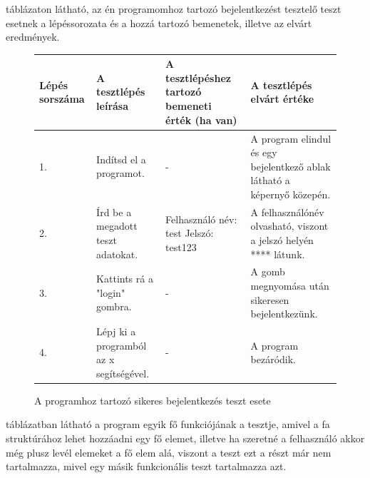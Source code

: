  táblázaton látható, az én programomhoz tartozó bejelentkezést tesztelő teszt esetnek a lépéssorozata és a hozzá tartozó bemenetek, illetve az elvárt eredmények.

\begin{figure} [h]
	\begin{center}
		\resizebox{\textwidth}{!} {
			\begin{tabular}{ |p{3cm}|p{5cm}|p{5cm}|p{5cm}| } 
				\hline
				Lépés sorszáma & A tesztlépés leírása & A tesztlépéshez tartozó bemeneti érték (ha van) & A tesztlépés elvárt értéke  \\ 
				\hline
				1. & Indítsd el a programot. & - & A program elindul és egy bejelentkező ablak látható a képernyő közepén.  \\ 
				\hline
				2. & Írd be a megadott teszt adatokat. & Felhasználó név: test \newline Jelszó: test123 & A felhasználónév olvasható, viszont a jelszó helyén **** látunk.\\ 
				\hline
				3. & Kattints rá a "login" gombra. & - & A gomb megnyomása után sikeresen bejelentkezünk. \\
				\hline
				4. & Lépj ki a programból az x segítségével. & - & A program bezáródik. \\
				\hline
			\end{tabular}
		}
	\end{center}
	\caption{A programhoz tartozó sikeres bejelentkezés teszt esete}
	\label{fig:successcase}
\end{figure}

 táblázatban látható a program egyik fő funkciójának a tesztje, amivel a fa struktúrához lehet hozzáadni egy fő elemet, illetve ha szeretné a felhasználó akkor még plusz levél elemeket a fő elem alá, viszont a teszt ezt a részt már nem tartalmazza, mivel egy másik funkcionális teszt tartalmazza azt.

